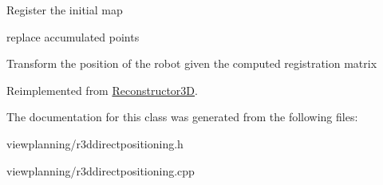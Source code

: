 Register the initial map

replace accumulated points

Transform the position of the robot given the computed registration matrix 

Reimplemented from \hyperlink{classReconstructor3D}{Reconstructor3D}.



The documentation for this class was generated from the following files\+:\begin{DoxyCompactItemize}
\item 
viewplanning/r3ddirectpositioning.\+h\item 
viewplanning/r3ddirectpositioning.\+cpp\end{DoxyCompactItemize}
